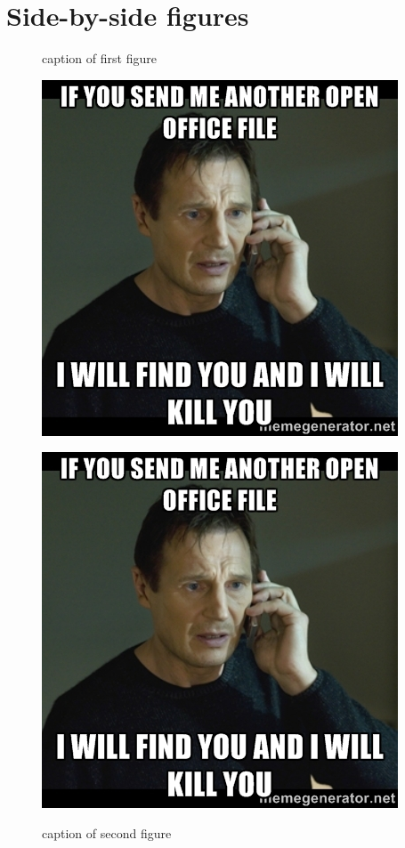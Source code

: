 \documentclass{article}
\begin{document}
\section{Side-by-side figures}

\begin{figure}[h]
    \begin{floatrow}[2]
        \ffigbox
        {
         \caption{caption of first figure}
         \label{fig1}
        }
        {\includegraphics[width=\linewidth]{./img/57224825}}
        
        \ffigbox
        {
         \caption{caption of second figure}
         \label{fig2}
        }
        {\includegraphics[width=\linewidth]{./img/57224825}}
    \end{floatrow}
\end{figure}
\end{document}
